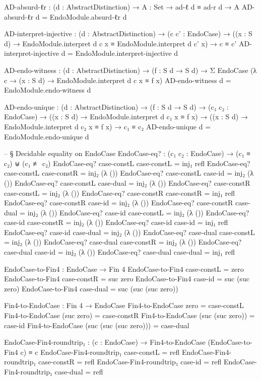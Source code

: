 \documentclass[11pt,a4paper]{book}
\begin{document}
\begin{code}
AD-absurd-ℓr : (d : AbstractDistinction) → {A : Set} → ad-ℓ d ≡ ad-r d → A
AD-absurd-ℓr d = EndoModule.absurd-ℓr d

AD-interpret-injective : (d : AbstractDistinction) →
  (c c' : EndoCase) →
  ((x : S d) → EndoModule.interpret d c x ≡ EndoModule.interpret d c' x) →
  c ≡ c'
AD-interpret-injective d = EndoModule.interpret-injective d

AD-endo-witness : (d : AbstractDistinction) → (f : S d → S d) →
                  Σ EndoCase (λ c → (x : S d) → EndoModule.interpret d c x ≡ f x)
AD-endo-witness d = EndoModule.endo-witness d

AD-endo-unique : (d : AbstractDistinction) → (f : S d → S d) →
                 (c₁ c₂ : EndoCase) →
                 ((x : S d) → EndoModule.interpret d c₁ x ≡ f x) →
                 ((x : S d) → EndoModule.interpret d c₂ x ≡ f x) →
                 c₁ ≡ c₂
AD-endo-unique d = EndoModule.endo-unique d

-- § Decidable equality on EndoCase
EndoCase-eq? : (c₁ c₂ : EndoCase) → (c₁ ≡ c₂) ⊎ (c₁ ≢ c₂)
EndoCase-eq? case-constL case-constL = inj₁ refl
EndoCase-eq? case-constL case-constR = inj₂ (λ ())
EndoCase-eq? case-constL case-id     = inj₂ (λ ())
EndoCase-eq? case-constL case-dual   = inj₂ (λ ())
EndoCase-eq? case-constR case-constL = inj₂ (λ ())
EndoCase-eq? case-constR case-constR = inj₁ refl
EndoCase-eq? case-constR case-id     = inj₂ (λ ())
EndoCase-eq? case-constR case-dual   = inj₂ (λ ())
EndoCase-eq? case-id     case-constL = inj₂ (λ ())
EndoCase-eq? case-id     case-constR = inj₂ (λ ())
EndoCase-eq? case-id     case-id     = inj₁ refl
EndoCase-eq? case-id     case-dual   = inj₂ (λ ())
EndoCase-eq? case-dual   case-constL = inj₂ (λ ())
EndoCase-eq? case-dual   case-constR = inj₂ (λ ())
EndoCase-eq? case-dual   case-id     = inj₂ (λ ())
EndoCase-eq? case-dual   case-dual   = inj₁ refl

EndoCase-to-Fin4 : EndoCase → Fin 4
EndoCase-to-Fin4 case-constL = zero
EndoCase-to-Fin4 case-constR = suc zero
EndoCase-to-Fin4 case-id     = suc (suc zero)
EndoCase-to-Fin4 case-dual   = suc (suc (suc zero))

Fin4-to-EndoCase : Fin 4 → EndoCase
Fin4-to-EndoCase zero                      = case-constL
Fin4-to-EndoCase (suc zero)                = case-constR
Fin4-to-EndoCase (suc (suc zero))          = case-id
Fin4-to-EndoCase (suc (suc (suc zero)))    = case-dual

EndoCase-Fin4-roundtrip₁ : (c : EndoCase) → Fin4-to-EndoCase (EndoCase-to-Fin4 c) ≡ c
EndoCase-Fin4-roundtrip₁ case-constL = refl
EndoCase-Fin4-roundtrip₁ case-constR = refl
EndoCase-Fin4-roundtrip₁ case-id     = refl
EndoCase-Fin4-roundtrip₁ case-dual   = refl


\end{code}
\end{document}
